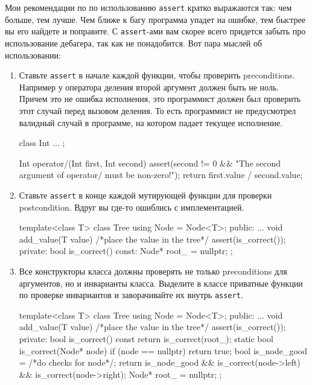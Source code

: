 Мои рекомендации по по использованию \verb"assert" кратко выражаются так: чем больше, тем лучше.
Чем ближе к багу программа упадет на ошибке, тем быстрее вы его найдете и поправите.
С \verb"assert"-ами вам скорее всего придется забыть про использование дебагера, так как не понадобится.
Вот пара мыслей об использовании:
\begin{enumerate}
\item  Ставьте \verb"assert" в начале каждой функции, чтобы проверить preconditions.
Например у оператора деления второй аргумент должен быть не ноль.
Причем это не ошибка исполнения, это программист должен был проверить этот случай перед вызовом деления.
То есть программист не предусмотрел валидный случай в программе, на котором падает текущее исполнение.
\begin{cppcode}
class Int {
  ...
};

Int operator/(Int first, Int second) {
  assert(second != 0 && "The second argument of operator/ must be non-zero!");
    return first.value / second.value;
}
\end{cppcode}

\item Ставьте \verb"assert" в конце каждой мутирующей функции для проверки postcondition.
Вдруг вы где-то ошиблись с имплементацией.
\begin{cppcode}
template<class T>
class Tree {
  using Node = Node<T>;
public:
  ...
  void add_value(T value) {
    /*place the value in the tree*/
    assert(is_correct());
  }
private:
  bool is_correct() const:
  Node* root_ = nullptr;
};
\end{cppcode}

\item Все конструкторы класса должны проверять не только preconditions для аргументов, но и инварианты класса.
Выделите в классе приватные функции по проверке инвариантов и заворачивайте их внутрь \verb"assert".
\begin{cppcode}
template<class T>
class Tree {
  using Node = Node<T>;
public:
  ...
  void add_value(T value) {
    /*place the value in the tree*/
    assert(is_correct());
  }
private:
  bool is_correct() const {
    return is_correct(root_);  
  }
  static bool is_correct(Node* node) {
    if (node == nullptr)
      return true;
    bool is_node_good = /*do checks for node*/;    
    return is_node_good && is_correct(node->left) && is_correct(node->right);
  }
  Node* root_ = nullptr;
};
\end{cppcode}


\end{enumerate}
